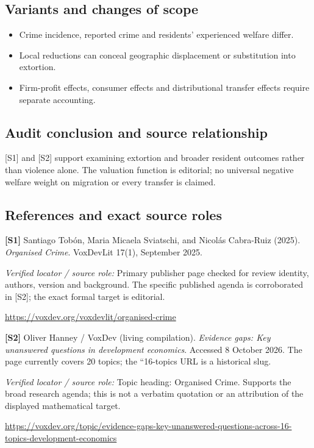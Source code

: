 \documentclass[11pt,a4paper]{article}
\begin{document}
\subsection*{Variants and changes of scope}

\begin{itemize}
\item Crime incidence, reported crime and residents' experienced welfare differ.
\item Local reductions can conceal geographic displacement or substitution into extortion.
\item Firm-profit effects, consumer effects and distributional transfer effects require separate accounting.
\end{itemize}

\subsection*{Audit conclusion and source relationship}

[S1] and [S2] support examining extortion and broader resident outcomes rather than violence alone. The valuation function is editorial; no universal negative welfare weight on migration or every transfer is claimed.

\subsection*{References and exact source roles}

{\footnotesize\raggedright
\par\noindent\textbf{[S1]} Santiago Tobón, Maria Micaela Sviatschi, and Nicolás Cabra-Ruiz (2025). \emph{Organised Crime}. VoxDevLit 17(1), September 2025.\par \textit{Verified locator / source role:} Primary publisher page checked for review identity, authors, version and background. The specific published agenda is corroborated in [S2]; the exact formal target is editorial.\par \url{https://voxdev.org/voxdevlit/organised-crime}\par\smallskip
\par\noindent\textbf{[S2]} Oliver Hanney / VoxDev (living compilation). \emph{Evidence gaps: Key unanswered questions in development economics}. Accessed 8 October 2026. The page currently covers 20 topics; the ``16-topics URL is a historical slug.\par \textit{Verified locator / source role:} Topic heading: Organised Crime. Supports the broad research agenda; this is not a verbatim quotation or an attribution of the displayed mathematical target.\par \url{https://voxdev.org/topic/evidence-gaps-key-unanswered-questions-across-16-topics-development-economics}\par\smallskip
}
\end{document}
